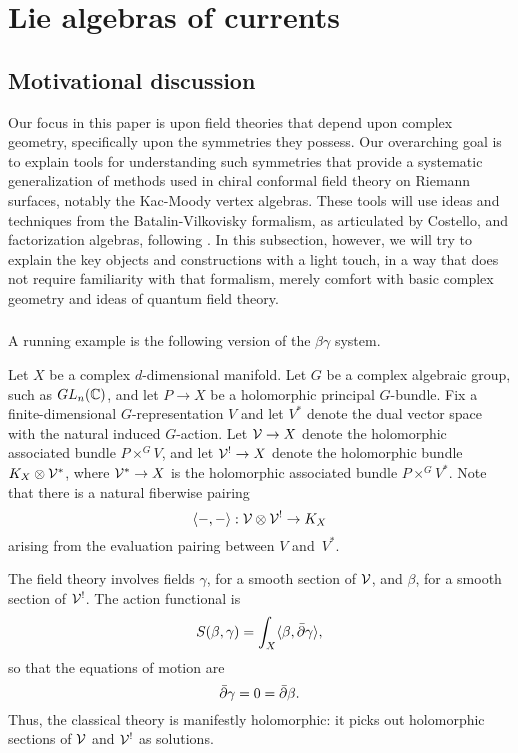 \section{Lie algebras of currents}

\subsection{Motivational discussion}


Our focus in this paper is upon field theories that depend upon complex geometry, 
specifically upon the symmetries they possess.
Our overarching goal is to explain tools for understanding such symmetries that provide a systematic generalization of methods used in chiral conformal field theory on Riemann surfaces,
notably the Kac-Moody vertex algebras.
These tools will use ideas and techniques from the Batalin-Vilkovisky formalism, as articulated by Costello, and factorization algebras, following \cite{CG1,CG2}.
In this subsection, however, we will try to explain the key objects and constructions with a light touch,
in a way that does not require familiarity with that formalism,
merely comfort with basic complex geometry and ideas of quantum field theory.

\subsubsection{}

A running example is the following version of the $\beta\gamma$ system.

Let $X$ be a complex $d$-dimensional manifold.
Let $G$ be a complex algebraic group, such as $GL_n(\mathbb C)$, 
and let $P \to X$ be a holomorphic principal $G$-bundle.
Fix a finite-dimensional $G$-representation $V$ and let $V^*$ denote the dual vector space with the natural induced $G$-action.
Let $\mathcal V \to X$ denote the holomorphic associated bundle $P \times^G V$, 
and let $\mathcal V^! \to X$ denote the holomorphic bundle $K_X \otimes \mathcal V^*$,
where $\mathcal V^* \to X$ is the holomorphic associated bundle $P \times^G V^*$.
Note that there is a natural fiberwise pairing
\[
\langle-,-\rangle: \mathcal V \otimes \mathcal V^! \to K_X
\]
arising from the evaluation pairing between $V$ and~$V^*$.

The field theory involves fields $\gamma$, for a smooth section of $\mathcal V$, and $\beta$, for a smooth section of $\mathcal V^!$.
The action functional is
\[
S(\beta,\gamma) = \int_X \langle \beta, \Bar{\partial} \gamma \rangle,
\]
so that the equations of motion are
\[
\Bar{\partial} \gamma = 0 = \Bar{\partial} \beta.
\]
Thus, the classical theory is manifestly holomorphic: it picks out holomorphic sections of $\mathcal V$ and $\mathcal V^!$ as solutions.

